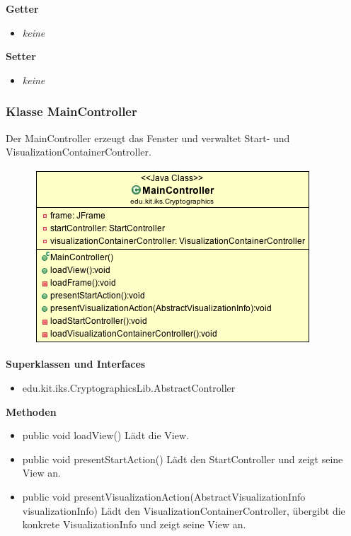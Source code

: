 \documentclass{article}
\begin{document}
      \textbf{Getter}
      \begin{itemize}
        \item \textit{keine}
      \end{itemize}

      \textbf{Setter}
      \begin{itemize}
        \item \textit{keine}
      \end{itemize}

    \subsubsection{Klasse MainController}
      Der MainController erzeugt das Fenster und verwaltet Start- und VisualizationContainerController.
      \begin{figure}[H]
        \centering
        \includegraphics[width=\textwidth]{resources/edu-kit-iks-Cryptographics-MainController}
      \end{figure}

      \textbf{Superklassen und Interfaces}
      \begin{itemize}
        \item edu.kit.iks.CryptographicsLib.AbstractController
      \end{itemize}
      
      \textbf{Methoden}
      \begin{itemize}
        \item public void loadView() \newline
        Lädt die View.
        \item public void presentStartAction() \newline
        Lädt den StartController und zeigt seine View an.
        \item public void presentVisualizationAction(AbstractVisualizationInfo visualizationInfo) \newline
        Lädt den VisualizationContainerController, übergibt die konkrete VisualizationInfo und zeigt seine View an.
      \end{itemize}
\end{document}
